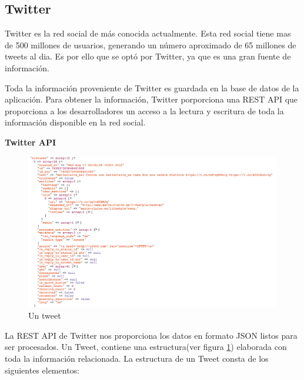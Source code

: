 \subsection{Twitter}

Twitter es la red social de  más conocida actualmente. Esta red social tiene mas de 500 millones de usuarios, generando un número aproximado de 65 millones de tweets al dia. Es por ello que se optó por Twitter, ya que es una gran fuente de información.

\vspace{5 mm}

Toda la información proveniente de Twitter es guardada en la base de datos de la aplicación. Para obtener la información, Twitter porporciona una REST API que proporciona a los desarrolladores un acceso a la lectura y escritura de toda la información disponible en la red social.

\vspace{5 mm}

\textbf{Twitter API}

\vspace{5 mm}

\begin{figure}
\begin{center}
\includegraphics[width=1.0\textwidth]{imagenes/estructura-tweet.png}
\caption{Un tweet}
\label{tweet}
\end{center}
\end{figure}

La REST API de Twitter nos proporciona los datos en formato JSON listos para ser procesados. Un Tweet, contiene una estructura(ver figura \ref{tweet}) elaborada con toda la información relacionada. La estructura de un Tweet consta de los siguientes elementos:

